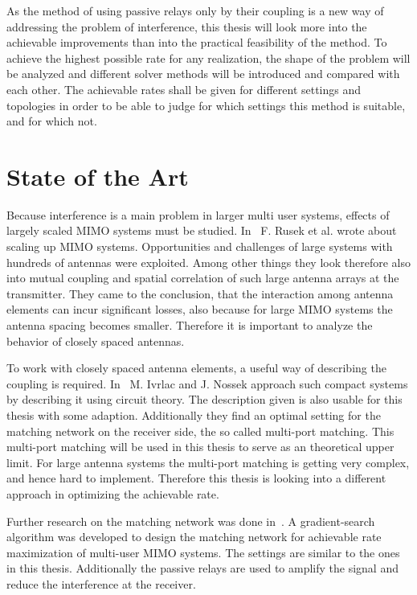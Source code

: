 As the method of using passive relays only by their coupling is a new way of addressing the problem of interference, this thesis will look more into the achievable improvements than into the practical feasibility of the method.
To achieve the highest possible rate for any realization, the shape of the problem will be analyzed and different solver methods will be introduced and compared with each other.
The achievable rates shall be given for different settings and topologies in order to be able to judge for which settings this method is suitable, and for which not.

\section{State of the Art}
\label{sec:SoA}

Because interference is a main problem in larger multi user systems, effects of largely scaled MIMO systems must be studied.
In~\cite{rusek13} F. Rusek et al. wrote about scaling up MIMO systems.
Opportunities and challenges of large systems with hundreds of antennas were exploited.
Among other things they look therefore also into mutual coupling and spatial correlation of such large antenna arrays at the transmitter.
They came to the conclusion, that the interaction among antenna elements can incur significant losses, also because for large MIMO systems the antenna spacing becomes smaller.
Therefore it is important to analyze the behavior of closely spaced antennas.

To work with closely spaced antenna elements, a useful way of describing the coupling is required.
In~\cite{Nossek} M. Ivrlac and J. Nossek approach such compact systems by describing it using circuit theory.
The description given is also usable for this thesis with some adaption.
Additionally they find an optimal setting for the matching network on the receiver side, the so called multi-port matching.
This multi-port matching will be used in this thesis to serve as an theoretical upper limit.
For large antenna systems the multi-port matching is getting very complex, and hence hard to implement.
Therefore this thesis is looking into a different approach in optimizing the achievable rate. 

Further research on the matching network was done in~\cite{Yahia2013}.
A gradient-search algorithm was developed to design the matching network for achievable rate maximization of multi-user MIMO systems.
The settings are similar to the ones in this thesis.
Additionally the passive relays are used to amplify the signal and reduce the interference at the receiver.

